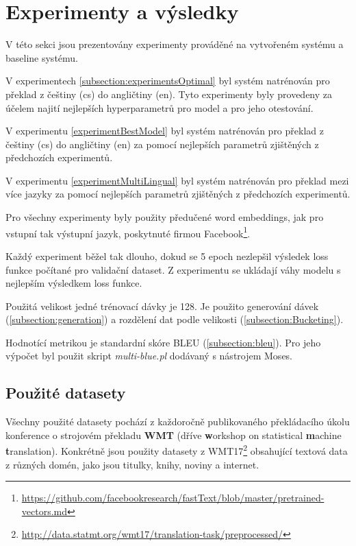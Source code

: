 \chapter{Experimenty a výsledky} \label{chapter:results}
V této sekci jsou prezentovány experimenty prováděné na vytvořeném systému a baseline systému.

V experimentech \ref{subsection:experimentsOptimal} byl systém natrénován pro překlad z češtiny (cs) do angličtiny (en). Tyto experimenty byly provedeny za účelem najití nejlepších hyperparametrů pro model a pro jeho otestování.

V experimentu \ref{experimentBestModel} byl systém natrénován pro překlad z češtiny (cs) do angličtiny (en) za pomocí nejlepších parametrů zjištěných z předchozích experimentů.

V experimentu \ref{experimentMultiLingual} byl systém natrénován pro překlad mezi více jazyky za pomocí nejlepších parametrů zjištěných z předchozích experimentů.

Pro všechny experimenty byly použity předučené word embeddings, jak pro vstupní tak výstupní jazyk, poskytnuté firmou Facebook\footnote{\url{https://github.com/facebookresearch/fastText/blob/master/pretrained-vectors.md}}.

Každý experiment běžel tak dlouho, dokud se 5 epoch nezlepšil výsledek loss funkce počítané pro validační dataset. Z experimentu se ukládají váhy modelu s nejlepším výsledkem loss funkce.

Použitá velikost jedné trénovací dávky je 128. Je použito generování dávek (\ref{subsection:generation}) a rozdělení dat podle velikosti (\ref{subsection:Bucketing}).

Hodnotící metrikou je standardní skóre BLEU (\ref{subsection:bleu}). Pro jeho výpočet byl použit skript \emph{multi-blue.pl} dodávaný s nástrojem Moses.


\section{Použité datasety}
Všechny použité datasety pochází z každoročně publikovaného překládacího úkolu konference o strojovém překladu \textbf{WMT} (dříve \textbf{w}orkshop on statistical \textbf{m}achine \textbf{t}ranslation). Konkrétně jsou použity datasety z WMT17\footnote{\url{http://data.statmt.org/wmt17/translation-task/preprocessed/}} obsahující textová data z různých domén, jako jsou titulky, knihy, noviny a internet.

